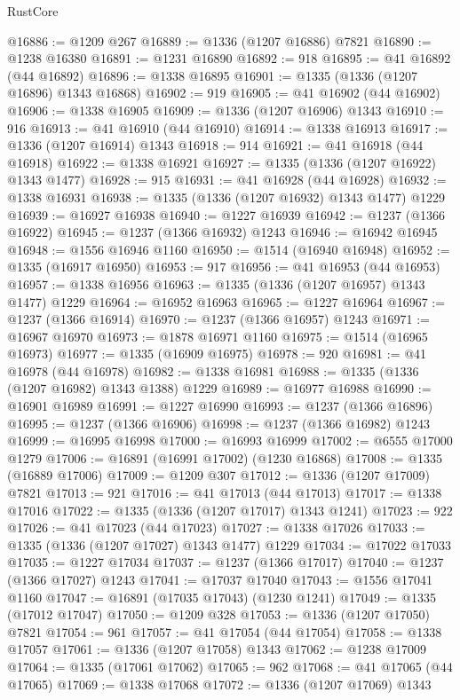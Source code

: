 \begin{lexlean}{RustCore}
\begin{coremodule}
@16886 := @1209 @267
@16889 := @1336 (@1207 @16886) @7821
@16890 := @1238 @16380
@16891 := @1231 @16890
@16892 := 918
@16895 := @41 @16892 (@44 @16892)
@16896 := @1338 @16895
@16901 := @1335 (@1336 (@1207 @16896) @1343 @16868)
@16902 := 919
@16905 := @41 @16902 (@44 @16902)
@16906 := @1338 @16905
@16909 := @1336 (@1207 @16906) @1343
@16910 := 916
@16913 := @41 @16910 (@44 @16910)
@16914 := @1338 @16913
@16917 := @1336 (@1207 @16914) @1343
@16918 := 914
@16921 := @41 @16918 (@44 @16918)
@16922 := @1338 @16921
@16927 := @1335 (@1336 (@1207 @16922) @1343 @1477)
@16928 := 915
@16931 := @41 @16928 (@44 @16928)
@16932 := @1338 @16931
@16938 := @1335 (@1336 (@1207 @16932) @1343 @1477) @1229
@16939 := @16927 @16938
@16940 := @1227 @16939
@16942 := @1237 (@1366 @16922)
@16945 := @1237 (@1366 @16932) @1243
@16946 := @16942 @16945
@16948 := @1556 @16946 @1160
@16950 := @1514 (@16940 @16948)
@16952 := @1335 (@16917 @16950)
@16953 := 917
@16956 := @41 @16953 (@44 @16953)
@16957 := @1338 @16956
@16963 := @1335 (@1336 (@1207 @16957) @1343 @1477) @1229
@16964 := @16952 @16963
@16965 := @1227 @16964
@16967 := @1237 (@1366 @16914)
@16970 := @1237 (@1366 @16957) @1243
@16971 := @16967 @16970
@16973 := @1878 @16971 @1160
@16975 := @1514 (@16965 @16973)
@16977 := @1335 (@16909 @16975)
@16978 := 920
@16981 := @41 @16978 (@44 @16978)
@16982 := @1338 @16981
@16988 := @1335 (@1336 (@1207 @16982) @1343 @1388) @1229
@16989 := @16977 @16988
@16990 := @16901 @16989
@16991 := @1227 @16990
@16993 := @1237 (@1366 @16896)
@16995 := @1237 (@1366 @16906)
@16998 := @1237 (@1366 @16982) @1243
@16999 := @16995 @16998
@17000 := @16993 @16999
@17002 := @6555 @17000 @1279
@17006 := @16891 (@16991 @17002) (@1230 @16868)
@17008 := @1335 (@16889 @17006)
@17009 := @1209 @307
@17012 := @1336 (@1207 @17009) @7821
@17013 := 921
@17016 := @41 @17013 (@44 @17013)
@17017 := @1338 @17016
@17022 := @1335 (@1336 (@1207 @17017) @1343 @1241)
@17023 := 922
@17026 := @41 @17023 (@44 @17023)
@17027 := @1338 @17026
@17033 := @1335 (@1336 (@1207 @17027) @1343 @1477) @1229
@17034 := @17022 @17033
@17035 := @1227 @17034
@17037 := @1237 (@1366 @17017)
@17040 := @1237 (@1366 @17027) @1243
@17041 := @17037 @17040
@17043 := @1556 @17041 @1160
@17047 := @16891 (@17035 @17043) (@1230 @1241)
@17049 := @1335 (@17012 @17047)
@17050 := @1209 @328
@17053 := @1336 (@1207 @17050) @7821
@17054 := 961
@17057 := @41 @17054 (@44 @17054)
@17058 := @1338 @17057
@17061 := @1336 (@1207 @17058) @1343
@17062 := @1238 @17009
@17064 := @1335 (@17061 @17062)
@17065 := 962
@17068 := @41 @17065 (@44 @17065)
@17069 := @1338 @17068
@17072 := @1336 (@1207 @17069) @1343

\end{coremodule}
\end{lexlean}
